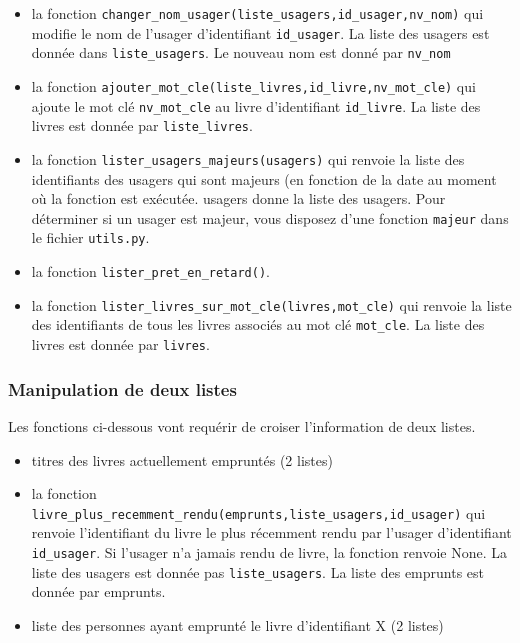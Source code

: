\documentclass[10pt,a4paper,onecolumn]{article}
\begin{document}
\begin{itemize}

\item la fonction \texttt{changer\_nom\_usager(liste\_usagers,id\_usager,nv\_nom)} qui modifie le nom de l'usager d'identifiant \texttt{id\_usager}. La liste des usagers est donnée dans \texttt{liste\_usagers}. Le nouveau nom est donné par \texttt{nv\_nom}

\item la fonction \texttt{ajouter\_mot\_cle(liste\_livres,id\_livre,nv\_mot\_cle)} qui ajoute le mot clé \texttt{nv\_mot\_cle} au livre d'identifiant \texttt{id\_livre}. La liste des livres est donnée par \texttt{liste\_livres}.

\item la fonction \texttt{lister\_usagers\_majeurs(usagers)} qui renvoie la liste des identifiants des usagers qui sont majeurs (en fonction de la date au moment où la fonction est exécutée. usagers donne la liste des usagers. Pour déterminer si un usager est majeur, vous disposez d'une fonction \texttt{majeur} dans le fichier \texttt{utils.py}.

\item la fonction \texttt{lister\_pret\_en\_retard()}.

\item la fonction \texttt{lister\_livres\_sur\_mot\_cle(livres,mot\_cle)} qui renvoie la liste des identifiants de tous les livres associés au mot clé \texttt{mot\_cle}. La liste des livres est donnée par \texttt{livres}.

\end{itemize}

\subsubsection{Manipulation de deux listes}

Les fonctions ci-dessous vont requérir de croiser l'information de deux listes.

\begin{itemize}


\item titres des livres actuellement empruntés (2 listes)

\item la fonction \texttt{livre\_plus\_recemment\_rendu(emprunts,liste\_usagers,id\_usager)} qui renvoie l'identifiant du livre le plus récemment rendu par l'usager d'identifiant \texttt{id\_usager}. Si l'usager n'a jamais rendu de livre, la fonction renvoie None. La liste des usagers est donnée pas \texttt{liste\_usagers}. La liste des emprunts est donnée par emprunts.

\item liste des personnes ayant emprunté le livre d'identifiant X (2 listes)

\end{itemize}
\end{document}
